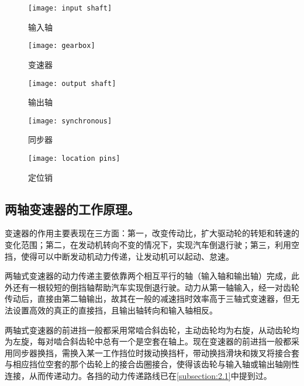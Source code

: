 \documentclass[UTF8]{ctexart}
\numberwithin{figure}{section}
\numberwithin{table}{section}
\begin{document}
\begin{figure}[htbp]
	\centering
	\begin{minipage}[b]{0.18\textwidth}
		\centering
		\texttt{[image: input shaft]}
		\caption{输入轴}
		\label{input shaft}
	\end{minipage}
	\begin{minipage}[b]{0.31\textwidth}
		\centering
		\begin{minipage}[b]{\textwidth}
			\centering
			\texttt{[image: gearbox]}
			\caption{变速器}
			\label{gearbox}
		\end{minipage}
		\begin{minipage}[b]{\textwidth}
			\centering
			\texttt{[image: output shaft]}
			\caption{输出轴}
			\label{output shaft}
		\end{minipage}
	\end{minipage}
	\begin{minipage}[b]{0.39\textwidth}
		\centering
		\begin{minipage}[b]{\textwidth}
			\centering
			\texttt{[image: synchronous]}
			\caption{同步器}
			\label{synchronous}
		\end{minipage}
		\begin{minipage}[b]{\textwidth}
			\centering
			\texttt{[image: location pins]}
			\caption{定位销}
			\label{location pins}
		\end{minipage}
	\end{minipage}
\end{figure}

\subsection{两轴变速器的工作原理。}

变速器的作用主要表现在三方面：第一，改变传动比，扩大驱动轮的转矩和转速的变化范围；第二，在发动机转向不变的情况下，实现汽车倒退行驶；第三，利用空挡，使得可以中断发动机动力传递，让发动机可以起动、怠速。

两轴式变速器的动力传递主要依靠两个相互平行的轴（输入轴和输出轴）完成，此外还有一根较短的倒挡轴帮助汽车实现倒退行驶。动力从第一轴输入，经一对齿轮传动后，直接由第二轴输出，故其在一般的减速挡时效率高于三轴式变速器，但无法设置高效的真正的直接挡，且输出轴转向和输入轴相反。

两轴式变速器的前进挡一般都采用常啮合斜齿轮，主动齿轮均为右旋，从动齿轮均为左旋，每对啮合斜齿轮中总有一个是空套在轴上。现在变速器的前进挡一般都采用同步器换挡，需换入某一工作挡位时拨动换挡杆，带动换挡滑块和拨叉将接合套与相应挡位空套的那个齿轮上的接合齿圈接合，使得该齿轮与输入轴或输出轴刚性连接，从而传递动力。各挡的动力传递路线已在\cref{subsection:2.1}中提到过。
\end{document}
